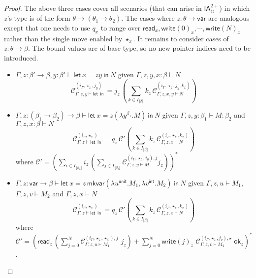 \documentclass{CSML}
\theoremstyle{definition}\newtheorem{definition}[thm]{Definition}
\theoremstyle{definition}\newtheorem{example}[thm]{Example}
\theoremstyle{definition}\newtheorem{proposition}[thm]{Proposition}
\theoremstyle{definition}\newtheorem{lemma}[thm]{Lemma}
\theoremstyle{definition}\newtheorem{theorem}[thm]{Theorem}
\theoremstyle{definition}\newtheorem{corollary}[thm]{Corollary}
\theoremstyle{definition}\newtheorem{remark}[thm]{Remark}
\newcommand\clg[1]{\mathcal{#1}}
\newcommand\mwrite[1]{\mathsf{write}(#1)}
\newcommand\mread{\mathsf{read}}
\newcommand\mok{\mathsf{ok}}
\newcommand\compi[2]{\mathcal{C}_{#1}^{#2}}
\newcommand\comp[1]{\mathcal{C}_{#1}}
\newcommand\ialoop{\mathsf{IA}_{\circlearrowright}}
\newcommand\iatwo{\ialoop^{2+}}
\newcommand\letin[2]{\mathsf{let}\ #1\ \mathsf{in}\ #2}
\newcommand\badvar[2]{\mathsf{mkvar}(#1,#2)}
\newcommand\comt{\mathsf{unit}}
\newcommand\expt{\mathsf{int}}
\newcommand\vart{\mathsf{var}}
\newcommand{\rarr}{\rightarrow}
\newcommand\cutout[1]{}
\newcommand\sem[1]{\llbracket #1 \rrbracket}
\newcommand\seq[2]{{#1} \vdash {#2}}
\newcommand\can{\mathbb{C}}
\begin{document}
\begin{proof}
The above three cases cover all scenarios (that can arise in $\iatwo$) in which $z$'s type 
is of the form $\theta\rarr(\theta_1\rarr\theta_2)$.
The cases where $z:\theta\rarr\vart$ are analogous except that one needs to use $q_x$ to range
over $\mread_x, \mwrite{0}_x, \cdots, \mwrite{N}_x$ rather than the single move enabled by $\star_x$.
It remains to consider cases of $z:\theta\rarr\beta$. The bound values are of base type, so  no new pointer indices need to be
introduced.
\begin{itemize}
\item $\seq{\Gamma,z:\beta'\rarr\beta, y:\beta'}{\letin{x=z y}{N}}$
given $\seq{\Gamma,z, y, x:\beta}{N}$
\[
\compi{\seq{\Gamma,z,y}{\letin{}{}}}{(i_\Gamma,\star_z, j_y)} = j_z\,  (\sum_{k\in I_{\sem{\beta}}}k_z\, 
\compi{\seq{\Gamma,z,x,y}{N}}{(i_\Gamma,\star_z,j_y,k_x)})
\]
\item $\seq{\Gamma,z:(\beta_1\rarr\beta_2)\rarr\beta}{\letin{x=z(\lambda y^{\beta_1}.M)}{N}}$
given $\seq{\Gamma,z, y:\beta_1}{M:\beta_2}$ and $\seq{\Gamma,z,x:\beta}{N}$
\[
\compi{\seq{\Gamma,z}{\letin{}{}}}{(i_\Gamma,\star_z)} = q_z\, \clg{C}'  (\sum_{k\in I_{\sem{\beta}}} k_z\,\compi{\seq{\Gamma,z,x}{N}}{(i_\Gamma,\star_z,k_x)})
\]
where $\clg{C}'=(\sum_{i\in I_{\sem{\beta_1}}} i_z\, (\sum_{j\in I_{\sem{\beta_2}}}\compi{\seq{\Gamma,z,y}{M}}{(i_\Gamma,\star_z,i_y),j} j_z) )^\ast$ 
\item $\seq{\Gamma,z:\vart\rarr\beta}{\letin{x=z\,\badvar{\lambda u^{\comt}.M_1}{\lambda v^\expt.M_2}}{N}}$
given $\seq{\Gamma,z, u}{M_1}$, $\seq{\Gamma,z, v}{M_2}$ and $\seq{\Gamma,z,x}{N}$
\[
\compi{\seq{\Gamma,z}{\letin{}{}}}{(i_\Gamma,\star_z)} = q_z\, \clg{C}'  (\sum_{k\in I_{\sem{\beta}}} k_z\, \compi{\seq{\Gamma,z,x}{N}}{(i_\Gamma,\star_z,k_x)})
\]
where $\clg{C}'=(\mread_z\, (\sum_{j=0}^N\compi{\seq{\Gamma,z,u}{M_1}}{(i_\Gamma,\star_z,\star_u),j} \,\,j_z) 
+ \sum_{j=0}^N\mwrite{j}_z\,\, \compi{\seq{\Gamma,z,v}{M_2}}{(i_\Gamma,\star_z,j_v),\star} \,\, \mok_z
)^\ast$.\qedhere
\end{itemize}
\cutout{
For brevity, we shall write $\comp{M}$ instead of $\comp{\seq{\Gamma}{M}}$ whenever 
it is clear what $\Gamma$ should be.
$\comp{M}$ can be decomposed as $\sum_{i\in I_A}(i\,\, \comp{M}^i)$. Obviously $\comp{M}$
is regular if, and only if, so is any of $\comp{M}^i$ ($i\in I_A$). Hence, it suffices to show
that $\comp{M}^i$ is regular for any relevant $i$. The proof proceeds by induction on the structure of canonical forms.
The most difficult cases are those involving $\mathsf{let}$. Note that
whenever a canonical form of an $\iatwo$-term is of the shape $\letin{x=z(\lambda x^\theta.\can)}{\can}$,
}
\end{proof}
\end{document}
